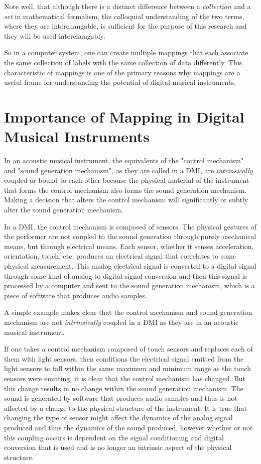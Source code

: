 Note well, that although there is a distinct difference between a \emph{collection} and a \emph{set} in mathematical formalism, the colloquial understanding of the two terms, where they are interchangable, is sufficient for the purpose of this research and they will be used interchangably. 

So in a computer system, one can create multiple mappings that each associate the same collection of labels with the same collection of data differently. This characteristic of mappings is one of the primary reasons why mappings are a useful frame for understanding the potential of digital musical instruments. 

\section{Importance of Mapping in Digital Musical Instruments}

In an acoustic musical instrument, the equivalents of the "control mechanism" and "sound generation mechanism", as they are called in a DMI, are \emph{intrinsically} coupled or bound to each other because the physical material of the instrument that forms the control mechanism also forms the sound generation mechanism. Making a decision that alters the control mechanism will significantly or subtly alter the sound generation mechanism.

In a DMI, the control mechanism is composed of sensors. The physical gestures of the performer are not coupled to the sound generation through purely mechanical means, but through electrical means. Each sensor, whether it senses acceleration, orientation, touch, etc. produces an electrical signal that correlates to some physical measurement. This analog electrical signal is converted to a digital signal through some kind of analog to digital signal conversion and then this signal is processed by a computer and sent to the sound generation mechanism, which is a piece of software that produces audio samples.

A simple example makes clear that the control mechanism and sound generation mechanism are not \emph{intrinsically} coupled in a DMI as they are in an acoustic musical instrument.

If one takes a control mechanism composed of touch sensors and replaces each of them with light sensors, then conditions the electrical signal emitted from the light sensors to fall within the same maximum and minimum range as the touch sensors were emitting, it is clear that the control mechanism has changed. But this change results in no change within the sound generation mechanism. The sound is generated by software that produces audio samples and thus is not affected by a change to the physical structure of the instrument. It is true that changing the type of sensor might affect the dynamics of the analog signal produced and thus the dynamics of the sound produced, however whether or not this coupling occurs is dependent on the signal conditioning and digital conversion that is used and is no longer an intrinsic aspect of the physical structure.

